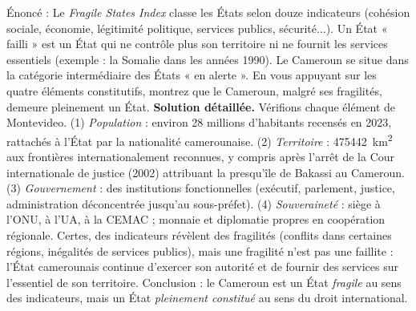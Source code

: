\documentclass[11pt]{article}
\begin{document}
\begin{exoresolu}
Énoncé : Le \emph{Fragile States Index} classe les États selon douze indicateurs (cohésion sociale, économie, légitimité politique, services publics, sécurité...). Un État « failli » est un État qui ne contrôle plus son territoire ni ne fournit les services essentiels (exemple : la Somalie dans les années 1990). Le Cameroun se situe dans la catégorie intermédiaire des États « en alerte ». En vous appuyant sur les quatre éléments constitutifs, montrez que le Cameroun, malgré ses fragilités, demeure pleinement un État.
\tcblower
\textbf{Solution détaillée.} Vérifions chaque élément de Montevideo. (1) \emph{Population} : environ \num{28} millions d'habitants recensés en 2023, rattachés à l'État par la nationalité camerounaise. (2) \emph{Territoire} : \SI{475442}{km^{2}} aux frontières internationalement reconnues, y compris après l'arrêt de la Cour internationale de justice (2002) attribuant la presqu'île de Bakassi au Cameroun. (3) \emph{Gouvernement} : des institutions fonctionnelles (exécutif, parlement, justice, administration déconcentrée jusqu'au sous-préfet). (4) \emph{Souveraineté} : siège à l'ONU, à l'UA, à la CEMAC ; monnaie et diplomatie propres en coopération régionale. Certes, des indicateurs révèlent des fragilités (conflits dans certaines régions, inégalités de services publics), mais une fragilité n'est pas une faillite : l'État camerounais continue d'exercer son autorité et de fournir des services sur l'essentiel de son territoire. Conclusion : le Cameroun est un État \emph{fragile} au sens des indicateurs, mais un État \emph{pleinement constitué} au sens du droit international.
\end{exoresolu}
\end{document}
